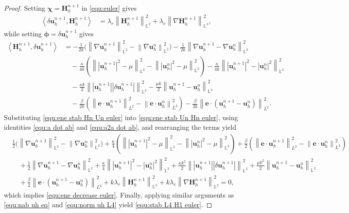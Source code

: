 \documentclass[11pt, reqno]{amsart}
\theoremstyle{definition}
\theoremstyle{remark}
\numberwithin{equation}{section}
\newcommand{\bff}{\boldsymbol}
\newcommand{\bb}{\mathbb}
\newcommand{\norm}[2]{\left\|{#1}\right\|_{#2}}
\newcommand{\inpro}[2]{\left\langle#1,#2\right\rangle}
\newcommand{\abs}[1]{\left|{#1}\right|}
\begin{document}
\begin{proof}
	Setting $\bff{\chi}=\bff{H}_h^{n+1}$ in \eqref{equ:euler} gives
	\begin{align}\label{equ:ene stab Un Hn euler}
		\inpro{\delta \bff{u}_h^{n+1}}{\bff{H}_h^{n+1}}
		&=
		\lambda_r \norm{\bff{H}_h^{n+1}}{\bb{L}^2}^2
		+
		\lambda_e \norm{\nabla \bff{H}_h^{n+1}}{\bb{L}^2}^2,
	\end{align}
	while setting $\bff{\phi}=\delta \bff{u}_h^{n+1}$ gives
	\begin{align}\label{equ:ene stab Hn Un euler}
		\nonumber
		\inpro{\bff{H}_h^{n+1}}{\delta \bff{u}_h^{n+1}}
		&=
		-
		\frac{1}{2k} \big(\norm{\nabla \bff{u}_h^{n+1}}{\bb{L}^2}^2 - \norm{\nabla \bff{u}_h^n}{\bb{L}^2}^2 \big)
		-
		\frac{1}{2k}\norm{\nabla \bff{u}_h^{n+1}- \nabla \bff{u}_h^n}{\bb{L}^2}^2
		\\
		\nonumber
		&\quad
		-
		\frac{\kappa}{4k} \left(\norm{\abs{\bff{u}_h^{n+1}}^2 - \mu}{\bb{L}^2}^2 - \norm{\abs{\bff{u}_h^n}^2 -\mu}{\bb{L}^2}^2 \right)
		-
		\frac{\kappa}{4k} \norm{\abs{\bff{u}_h^{n+1}}^2 - \abs{\bff{u}_h^n}^2}{\bb{L}^2}^2
		\\
		&\quad
		-
		\frac{\kappa k}{2} \norm{\abs{\bff{u}_h^{n+1}} \abs{\delta \bff{u}_h^{n+1}}}{\bb{L}^2}^2
		-
		\frac{\mu k}{2} \norm{\bff{u}_h^{n+1}-\bff{u}_h^n}{\bb{L}^2}^2
		\nonumber \\
		&\quad
		-
		\frac{\beta}{2k} \left(\norm{\bff{e}\cdot \bff{u}_h^{n+1}}{L^2}^2 - \norm{\bff{e}\cdot \bff{u}_h^n}{L^2}^2 \right)
		-
		\frac{\beta}{2k} \norm{\bff{e}\cdot (\bff{u}_h^{n+1}-\bff{u}_h^n)}{L^2}^2.
	\end{align}
	Substituting \eqref{equ:ene stab Hn Un euler} into \eqref{equ:ene stab Un Hn euler}, using identities \eqref{equ:a dot ab} and \eqref{equ:a2a dot ab}, and rearranging the terms yield
	\begin{align*}
		&\frac{1}{2} \big(\norm{\nabla \bff{u}_h^{n+1}}{\bb{L}^2}^2 - \norm{\nabla \bff{u}_h^n}{\bb{L}^2}^2 \big)
		+
		\frac{\kappa}{4} \left(\norm{\abs{\bff{u}_h^{n+1}}^2 - \mu}{\bb{L}^2}^2 - \norm{\abs{\bff{u}_h^n}^2 -\mu}{\bb{L}^2}^2 \right)
		+
		\frac{\beta}{2} \left(\norm{\bff{e}\cdot \bff{u}_h^{n+1}}{L^2}^2 - \norm{\bff{e}\cdot \bff{u}_h^n}{L^2}^2 \right)
		\\
		&\quad
		+
		\frac{1}{2}\norm{\nabla \bff{u}_h^{n+1}- \nabla \bff{u}_h^n}{\bb{L}^2}^2
		+
		\frac{\kappa}{4} \norm{\abs{\bff{u}_h^{n+1}}^2 - \abs{\bff{u}_h^n}^2}{\bb{L}^2}^2
		+
		\frac{\kappa k^2}{2} \norm{\abs{\bff{u}_h^{n+1}} \abs{\delta \bff{u}_h^{n+1}}}{\bb{L}^2}^2
		+
		\frac{\mu k^2}{2} \norm{\bff{u}_h^{n+1}-\bff{u}_h^n}{\bb{L}^2}^2
		\\
		&\quad
		+
		\frac{\beta}{2} \norm{\bff{e}\cdot (\bff{u}_h^{n+1}-\bff{u}_h^n)}{L^2}^2
		+
		k\lambda_r \norm{\bff{H}_h^{n+1}}{\bb{L}^2}^2
		+
		k\lambda_e \norm{\nabla \bff{H}_h^{n+1}}{\bb{L}^2}^2
		= 0,
	\end{align*}
	which implies \eqref{equ:ene decrease euler}. Finally, applying similar arguments as \eqref{equ:nab uh eq} and \eqref{equ:norm uh L4} yield \eqref{equ:stab L4 H1 euler}.
\end{proof}
\end{document}
